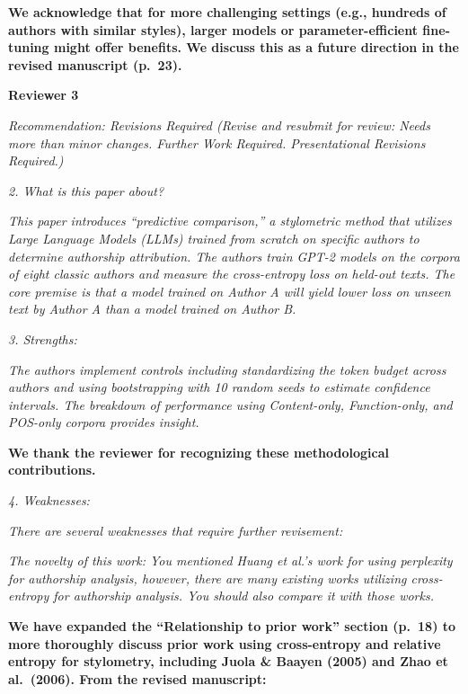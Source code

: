 \documentclass[11pt]{article}
\newcommand{\pref}[1]{p.~#1}
\begin{document}
\textbf{We acknowledge that for more challenging settings (e.g., hundreds of
authors with similar styles), larger models or parameter-efficient fine-tuning
might offer benefits. We discuss this as a future direction in the revised
manuscript (\pref{23}).}

\newpage


\textbf{\large Reviewer 3}

\textit{Recommendation: Revisions Required (Revise and resubmit for review:
Needs more than minor changes. Further Work Required. Presentational Revisions
Required.)}

\textit{2. What is this paper about?}

\textit{This paper introduces ``predictive comparison,'' a stylometric method
that utilizes Large Language Models (LLMs) trained from scratch on specific
authors to determine authorship attribution. The authors train GPT-2 models on
the corpora of eight classic authors and measure the cross-entropy loss on
held-out texts. The core premise is that a model trained on Author A will yield
lower loss on unseen text by Author A than a model trained on Author B.}

\textit{3. Strengths:}

\textit{The authors implement controls including standardizing the token budget
across authors and using bootstrapping with 10 random seeds to estimate
confidence intervals. The breakdown of performance using Content-only,
Function-only, and POS-only corpora provides insight.}

\textbf{We thank the reviewer for recognizing these methodological
contributions.}

\textit{4. Weaknesses:}

\textit{There are several weaknesses that require further revisement:}

\textit{The novelty of this work: You mentioned Huang et al.'s work for using
perplexity for authorship analysis, however, there are many existing works
utilizing cross-entropy for authorship analysis. You should also compare it
with those works.}

\textbf{We have expanded the ``Relationship to prior work'' section (\pref{18})
to more thoroughly discuss prior work using cross-entropy and relative entropy
for stylometry, including Juola \& Baayen (2005) and Zhao et al.\ (2006). From
the revised manuscript:}
\end{document}
